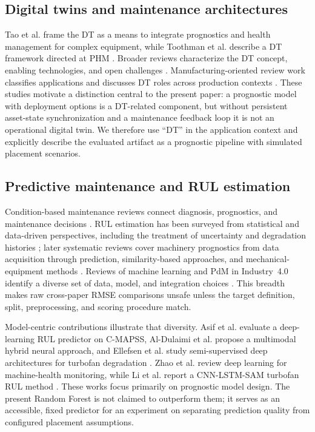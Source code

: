 ﻿\documentclass[conference]{IEEEtran}
\begin{document}
\subsection{Digital twins and maintenance architectures}
Tao et al. frame the DT as a means to integrate prognostics and health management for complex equipment, while Toothman et al. describe a DT framework directed at PHM \cite{tao2018,toothman2023}. Broader reviews characterize the DT concept, enabling technologies, and open challenges \cite{tao2019,fuller2020,rasheed2020,barricelli2019,jones2020,semeraro2021}. Manufacturing-oriented review work classifies applications and discusses DT roles across production contexts \cite{cimino2019}. These studies motivate a distinction central to the present paper: a prognostic model with deployment options is a DT-related component, but without persistent asset-state synchronization and a maintenance feedback loop it is not an operational digital twin. We therefore use “DT” in the application context and explicitly describe the evaluated artifact as a prognostic pipeline with simulated placement scenarios.

\subsection{Predictive maintenance and RUL estimation}
Condition-based maintenance reviews connect diagnosis, prognostics, and maintenance decisions \cite{jardine2006,peng2010}. RUL estimation has been surveyed from statistical and data-driven perspectives, including the treatment of uncertainty and degradation histories \cite{si2011,ahmadzadeh2014}; later systematic reviews cover machinery prognostics from data acquisition through prediction, similarity-based approaches, and mechanical-equipment methods \cite{lei2018,xue2022,zhang2023}. Reviews of machine learning and PdM in Industry~4.0 identify a diverse set of data, model, and integration choices \cite{carvalho2019,zonta2020,dalzochio2020}. This breadth makes raw cross-paper RMSE comparisons unsafe unless the target definition, split, preprocessing, and scoring procedure match.

Model-centric contributions illustrate that diversity. Asif et al. evaluate a deep-learning RUL predictor on C-MAPSS, Al-Dulaimi et al. propose a multimodal hybrid neural approach, and Ellefsen et al. study semi-supervised deep architectures for turbofan degradation \cite{asif2022,aldulaimi2019,ellefsen2019}. Zhao et al. review deep learning for machine-health monitoring, while Li et al. report a CNN-LSTM-SAM turbofan RUL method \cite{zhao2019,li2023}. These works focus primarily on prognostic model design. The present Random Forest is not claimed to outperform them; it serves as an accessible, fixed predictor for an experiment on separating prediction quality from configured placement assumptions.
\end{document}
